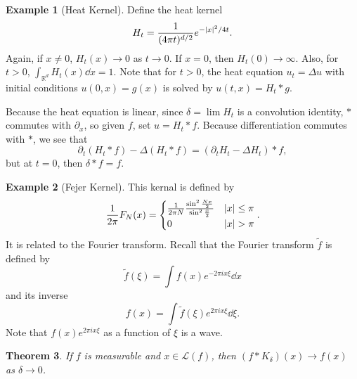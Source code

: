 \documentclass[leqno, openany]{memoir}
\newtheorem{thm}{Theorem}[chapter]
\theoremstyle{definition}
\newtheorem{exm}[thm]{Example}
\theoremstyle{remark}
\theoremstyle{plain}
\theoremstyle{definition}
\theoremstyle{remark}
\newcommand{\R}{\mathbb{R}}
\newcommand{\mc}[1]{\mathcal{#1}}
\newcommand{\wt}[1]{\widetilde{#1}}
\begin{document}
\begin{exm}[Heat Kernel]
    Define the heat kernel
    \[ H_t = \frac{1}{(4 \pi t)^{d/2}} e^{-\abs{x}^2/4t}. \]
    Again, if $x \neq 0$, $H_t(x) \to 0$ as $t \to 0$. If $x = 0$, then $H_t(0) \to \infty$. Also, for $t > 0$, $\int_{\R^d} H_t(x) \dd{x} = 1$. Note that for $t > 0$, the heat equation $u_t = \Delta u$ with initial conditions $u(0,x) = g(x)$ is solved by $u(t,x) = H_t * g$.

    Because the heat equation is linear, since $\delta = \lim H_t$ is a convolution identity, $*$ commutes with $\partial_x$, so given $f$, set $u = H_t * f$. Because differentiation commutes with $*$, we see that
    \[ \partial_t(H_t * f) - \Delta(H_t * f) = (\partial_t H_t - \Delta H_t) * f, \]
    but at $t = 0$, then $\delta * f = f$.
\end{exm}

\begin{exm}[Fejer Kernel]
    This kernal is defined by
    \[ \frac{1}{2 \pi} F_N(x) = \begin{cases}
        \frac{1}{2 \pi N} \frac{\sin^2 \frac{Nx}{2}}{\sin^2 \frac{x}{2}} & \abs{x} \leq \pi \\
        0 & \abs{x} > \pi
    \end{cases}. \]
    It is related to the Fourier transform. Recall that the Fourier transform $\wt{f}$ is defined by
    \[ \wt{f}(\xi) = \int f(x) e^{-2\pi i x \xi} \dd{x} \]
    and its inverse 
    \[ f(x) = \int \wt{f}(\xi) e^{2\pi i x \xi} \dd{\xi}. \]
    Note that $f(x)e^{2 \pi i x \xi}$ as a function of $\xi$ is a wave.
\end{exm}

\begin{thm}
    If $f$ is measurable and $x \in \mc{L}(f)$, then $(f * K_{\delta})(x) \to f(x)$ as $\delta \to 0$.
\end{thm}
\end{document}
